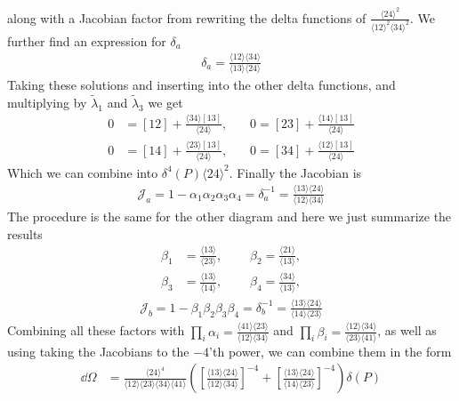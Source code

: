 \documentclass[letter,11pt]{article}
\newcommand{\ab}[1]{\langle #1 \rangle}
\newcommand{\sqb}[1]{[ #1 ]}
\begin{document}
along with a Jacobian factor from rewriting the delta functions of $\frac{\ab{24}^2}{\ab{12}^2\ab{34}^2}$.
We further find an expression for $\delta_a$
\begin{equation}
	\begin{aligned}
\delta_a=\frac{\langle 1 2 \rangle \langle 34 \rangle}{ \langle 13 \rangle\langle 24 \rangle}
	\end{aligned}
\end{equation}
Taking these solutions and inserting into the other delta functions, and multiplying by $\tilde\lambda_1$ and $\tilde\lambda_3$ we get
\begin{equation}
	\begin{aligned}
	0&=	\sqb{12}+\frac{\ab{34}\sqb{13}}{\ab{24}}
,	~~~~~~~~
	0=	\sqb{23}+\frac{\ab{14}\sqb{13}}{\ab{24}}
	\\
	0&=	\sqb{14}+\frac{\ab{23}\sqb{13}}{\ab{24}}
,	~~~~~~~~
	0=	\sqb{34}+\frac{\ab{12}\sqb{13}}{\ab{24}}
	\end{aligned}
\end{equation}
Which we can combine into $\delta^4(P)\ab{24}^2$. Finally the Jacobian is
\begin{equation}
	\begin{aligned}
		\mathcal{J}_a=1-\alpha_{1}\alpha_{2}\alpha_{3}\alpha_{4}=\delta_a^{-1}=
		\frac{ \langle 13 \rangle\langle 24 \rangle}{\langle 1 2 \rangle \langle 34 \rangle}
	\end{aligned}
\end{equation}
The procedure is the same for the other diagram and here we just summarize the results
\begin{equation}
	\begin{aligned}
		\beta_1&=\frac{\langle 13 \rangle}{\langle 23\rangle},~~~~~~~~~~\beta_2=\frac{\langle 21 \rangle}{\langle 13\rangle},\\
		\beta_3&=\frac{\langle 13 \rangle}{\langle 14\rangle},~~~~~~~~~~	\beta_4=\frac{\langle 34 \rangle}{\langle 13\rangle},
	\end{aligned}
\end{equation}
\begin{equation}
	\begin{aligned}
		\mathcal{J}_b=1-\beta_{1}\beta_{2}\beta_{3}\beta_{4}=\delta_b^{-1}=
		\frac{ \langle 13 \rangle\langle 24 \rangle}{\langle 1 4 \rangle \langle 23 \rangle}
	\end{aligned}
\end{equation}
Combining all these factors with $\prod_i \alpha_i=\frac{\ab{41}\ab{23}}{\ab{12}\ab{34}}$ and $\prod_i \beta_i=\frac{\ab{12}\ab{34}}{\ab{23}\ab{41}}$, as well as using taking the Jacobians to the $-4$'th power, we can combine them in the form
\begin{equation}
	\begin{aligned}
		\dd \Omega &=\frac{\ab{24}^4}{\ab{12}\ab{23}\ab{34}\ab{41}}\left( \left[\frac{ \langle 13 \rangle\langle 24 \rangle}{\langle 1 2 \rangle \langle 34 \rangle}\right]^{-4}+\left[	\frac{ \langle 13 \rangle\langle 24 \rangle}{\langle 1 4 \rangle \langle 23 \rangle}\right]^{-4}\right)\delta(P)\\
	\end{aligned}
\end{equation}
\end{document}
